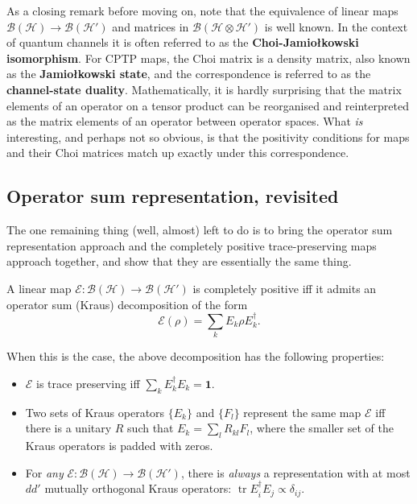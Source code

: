 \documentclass[fleqn]{article}
\providecommand{\tightlist}{%
  \setlength{\itemsep}{0pt}\setlength{\parskip}{0pt}}
\newenvironment{idea}{\noindent}{\medskip}
\begin{document}
As a closing remark before moving on, note that the equivalence of linear maps \(\mathscr{B}(\mathcal{H})\to \mathscr{B}(\mathcal{H'})\) and matrices in \(\mathscr{B}(\mathcal{H}\otimes\mathcal{H'})\) is well known.
In the context of quantum channels it is often referred to as the \textbf{Choi-Jamiołkowski isomorphism}.
For CPTP maps, the Choi matrix is a density matrix, also known as the \textbf{Jamiołkowski state}, and the correspondence is referred to as the \textbf{channel-state duality}.
Mathematically, it is hardly surprising that the matrix elements of an operator on a tensor product can be reorganised and reinterpreted as the matrix elements of an operator between operator spaces.
What \emph{is} interesting, and perhaps not so obvious, is that the positivity conditions for maps and their Choi matrices match up exactly under this correspondence.

\hypertarget{operator-sum-representation-revisited}{%
\subsection{Operator sum representation, revisited}\label{operator-sum-representation-revisited}}

The one remaining thing (well, almost) left to do is to bring the operator sum representation approach and the completely positive trace-preserving maps approach together, and show that they are essentially the same thing.

\begin{idea}

A linear map \(\mathcal{E}\colon\mathscr{B}(\mathcal{H})\to\mathscr{B}(\mathcal{H}')\) is completely positive iff it admits an operator sum (Kraus) decomposition of the form
\[
  \mathcal{E}(\rho) = \sum_k E_k\rho E^\dagger_k.
\]

When this is the case, the above decomposition has the following properties:

\begin{itemize}
\tightlist
\item
  \(\mathcal{E}\) is trace preserving iff \(\sum_k E^\dagger_kE_k=\mathbf{1}\).
\item
  Two sets of Kraus operators \(\{E_k\}\) and \(\{F_l\}\) represent the same map \(\mathcal{E}\) iff there is a unitary \(R\) such that \(E_k =\sum_l R_{kl}F_l\), where the smaller set of the Kraus operators is padded with zeros.
\item
  For \emph{any} \(\mathcal{E}\colon\mathscr{B}(\mathcal{H})\to\mathscr{B}(\mathcal{H}')\), there is \emph{always} a representation with at most \(dd'\) mutually orthogonal Kraus operators: \(\operatorname{tr}E_i^\dagger E_j\propto\delta_{ij}\).
\end{itemize}

\end{idea}
\end{document}
